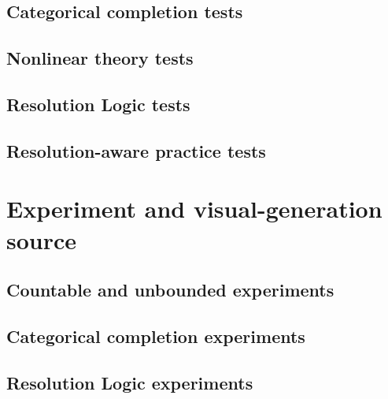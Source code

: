 \documentclass[11pt]{article}
\theoremstyle{definition}
\theoremstyle{remark}
\begin{document}
\clearpage
\subsection{Categorical completion tests}


\clearpage
\subsection{Nonlinear theory tests}


\clearpage
\subsection{Resolution Logic tests}


\clearpage
\subsection{Resolution-aware practice tests}



\clearpage
\section{Experiment and visual-generation source}
\subsection{Countable and unbounded experiments}


\clearpage
\subsection{Categorical completion experiments}


\clearpage
\subsection{Resolution Logic experiments}

\end{document}
